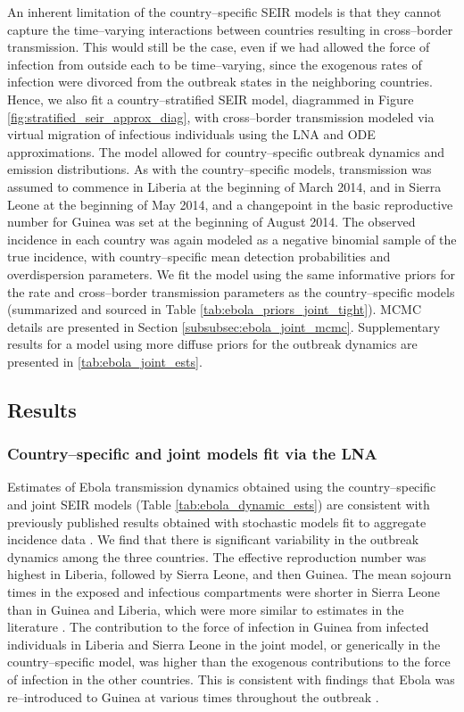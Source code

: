 An inherent limitation of the country--specific SEIR models is that they cannot capture the time--varying interactions between countries resulting in cross--border transmission. This would still be the case, even if we had allowed the force of infection from outside each to be time--varying, since the exogenous rates of infection were divorced from the outbreak states in the neighboring countries. Hence, we also fit a country--stratified SEIR model, diagrammed in Figure \ref{fig:stratified_seir_approx_diag}, with cross--border transmission modeled via virtual migration of infectious individuals using the LNA and ODE approximations. The model allowed for country--specific outbreak dynamics and emission distributions. As with the country--specific models, transmission was assumed to commence in Liberia at the beginning of March 2014, and in Sierra Leone at the beginning of May 2014, and a changepoint in the basic reproductive number for Guinea was set at the beginning of August 2014. The observed incidence in each country was again modeled as a negative binomial sample of the true incidence, with country--specific mean detection probabilities and overdispersion parameters. We fit the model using the same informative priors for the rate and cross--border transmission parameters as the country--specific models (summarized and sourced in Table \ref{tab:ebola_priors_joint_tight}). MCMC details are presented in Section \ref{subsubsec:ebola_joint_mcmc}. Supplementary results for a model using more diffuse priors for the outbreak dynamics are presented in \ref{tab:ebola_joint_ests}.

\subsection{Results}
\label{subsec:ebola_results}

\subsubsection{Country--specific and joint models fit via the LNA}
\label{subsubsec:ebola_lna_results}

Estimates of Ebola transmission dynamics obtained using the country--specific and joint SEIR models (Table \ref{tab:ebola_dynamic_ests}) are consistent with previously published results obtained with stochastic models fit to aggregate incidence data \cite{chretien2015mathematical}. We find that there is significant variability in the outbreak dynamics among the three countries. The effective reproduction number was highest in Liberia, followed by Sierra Leone, and then Guinea. The mean sojourn times in the exposed and infectious compartments were shorter in Sierra Leone than in Guinea and Liberia, which were more similar to estimates in the literature \cite{velasquez2015time}. The contribution to the force of infection in Guinea from infected individuals in Liberia and Sierra Leone in the joint model, or generically in the country--specific model, was higher than the exogenous contributions to the force of infection in the other countries. This is consistent with findings that Ebola was re--introduced to Guinea at various times throughout the outbreak \cite{dudas2017virus}. 

